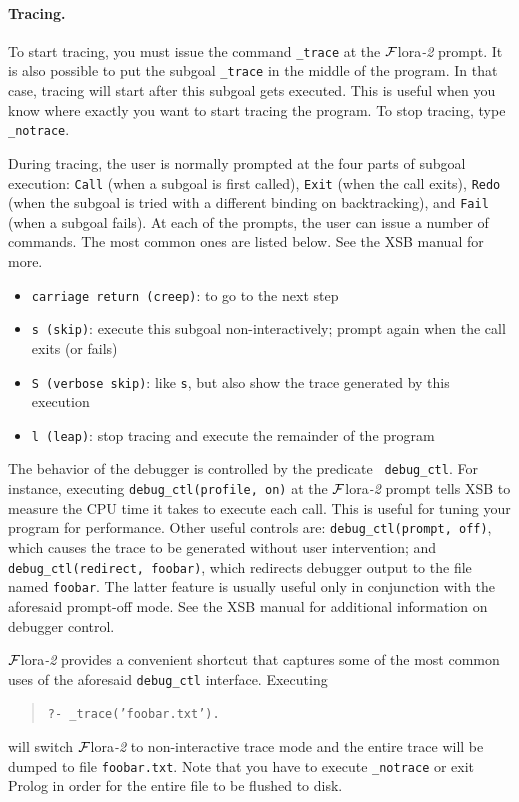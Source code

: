 \documentclass[11pt]{article}
\newcommand{\FLORA}{{\mbox{\sc ${\cal F}${lora}\rm\emph{-2}}}\xspace}
\begin{document}
\paragraph{Tracing.}
To start tracing, you must issue the command {\tt \_trace} at the
\FLORA prompt. It is also possible to put the subgoal {\tt \_trace} in
the middle of the program. In that case, tracing will start after this
subgoal gets executed. This is useful when you know where exactly you want
to start tracing the program. To stop tracing, type {\tt \_notrace}.

During tracing, the user is normally prompted at the four parts of subgoal
execution: {\tt Call} (when a subgoal is first called), {\tt Exit} (when
the call exits), {\tt Redo} (when the subgoal is tried with a different
binding on backtracking), and {\tt Fail} (when a subgoal fails).
At each of the prompts, the user can issue a number of commands. The most
common ones are listed below. See the XSB manual for more.
\begin{itemize}
  \item {\tt carriage return (creep)}:  to go to the next step  
  \item {\tt s (skip)}: execute this subgoal non-interactively; prompt
    again when the call exits (or fails)
  \item {\tt S (verbose skip)}: like {\tt s}, but also show the trace
    generated by this execution
  \item {\tt l (leap)}: stop tracing and execute the remainder of the
    program
\end{itemize}
The behavior of the debugger is controlled by the predicate {\tt
  debug\_ctl}. For instance, executing {\tt debug\_ctl(profile, on)} at the
\FLORA prompt tells XSB to measure the CPU time it takes to execute each
call. This is useful for tuning your program for performance. Other useful
controls are: {\tt debug\_ctl(prompt, off)}, which causes the trace to be
generated without user intervention; and {\tt debug\_ctl(redirect,
  foobar)}, which redirects debugger output to the file named {\tt foobar}.
The latter feature is usually useful only in conjunction with the aforesaid
prompt-off mode. See the XSB manual for additional information on debugger
control.

\FLORA provides a convenient shortcut that captures some of the most common
uses of the aforesaid {\tt debug\_ctl} interface. Executing
\begin{quote}
  {\tt     ?- \_trace('foobar.txt').}
\end{quote}
will switch \FLORA to non-interactive trace mode
and the entire trace will be dumped to file {\tt foobar.txt}.
Note that you have to execute {\tt \_notrace} or exit Prolog in order for the
entire file to be flushed to disk.
\end{document}

